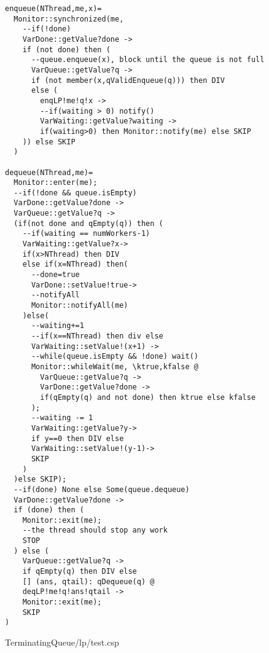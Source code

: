 \begin{lstlisting}
enqueue(NThread,me,x)=
  Monitor::synchronized(me,
    --if(!done)
    VarDone::getValue?done ->
    if (not done) then (
      --queue.enqueue(x), block until the queue is not full
      VarQueue::getValue?q ->
      if (not member(x,qValidEnqueue(q))) then DIV
      else (
        enqLP!me!q!x ->
        --if(waiting > 0) notify()
        VarWaiting::getValue?waiting ->
        if(waiting>0) then Monitor::notify(me) else SKIP
    )) else SKIP
  )
  
dequeue(NThread,me)=
  Monitor::enter(me);
  --if(!done && queue.isEmpty)
  VarDone::getValue?done ->
  VarQueue::getValue?q ->
  (if(not done and qEmpty(q)) then (
    --if(waiting == numWorkers-1)
    VarWaiting::getValue?x->
    if(x>NThread) then DIV
    else if(x=NThread) then(
      --done=true
      VarDone::setValue!true->
      --notifyAll
      Monitor::notifyAll(me)
    )else(
      --waiting+=1
      --if(x==NThread) then div else
      VarWaiting::setValue!(x+1) ->
      --while(queue.isEmpty && !done) wait()
      Monitor::whileWait(me, \ktrue,kfalse @
        VarQueue::getValue?q ->
        VarDone::getValue?done ->
        if(qEmpty(q) and not done) then ktrue else kfalse
      );
      --waiting -= 1
      VarWaiting::getValue?y->
      if y==0 then DIV else 
      VarWaiting::setValue!(y-1)->
      SKIP
    )
  )else SKIP);
  --if(done) None else Some(queue.dequeue)
  VarDone::getValue?done ->
  if (done) then (
    Monitor::exit(me);
    --the thread should stop any work
    STOP
  ) else (
    VarQueue::getValue?q ->
    if qEmpty(q) then DIV else
    [] (ans, qtail): qDequeue(q) @
    deqLP!me!q!ans!qtail ->
    Monitor::exit(me);
    SKIP
)
\end{lstlisting}
TerminatingQueue/lp/test.csp
